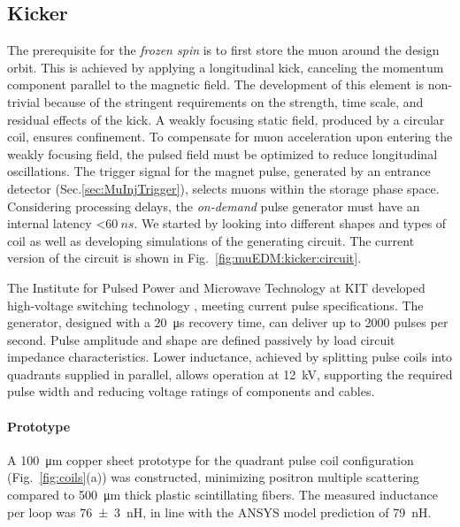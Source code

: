 \begin{refsection}
    \subsection{Kicker}
        The prerequisite for the \textit{frozen spin} is to first store the muon around the design orbit.
        This is achieved by applying a longitudinal kick, canceling the momentum component parallel to the magnetic field.
        The development of this element is non-trivial because of the stringent requirements on the strength, time scale, and residual effects of the kick.
        A weakly focusing static field, produced by a circular coil, ensures confinement. 
        To compensate for muon acceleration upon entering the weakly focusing field, the pulsed field must be optimized to reduce longitudinal oscillations.
        The trigger signal for the magnet pulse, generated by an entrance detector (Sec.\ref{sec:MuInjTrigger}), selects muons within the storage phase space. 
        Considering processing delays, the \textit{on-demand} pulse generator must have an internal latency <$\SI{60}{ns}$.
        We started by looking into different shapes and types of coil as well as developing \ltsp simulations of the generating circuit.
        The current version of the circuit is shown in Fig.~\ref{fig:muEDM:kicker:circuit}.
        
        The Institute for Pulsed Power and Microwave Technology at KIT developed high-voltage switching technology \cite{GateBoosting}, meeting current pulse specifications. 
        The generator, designed with a \SI{20}{\micro s} recovery time, can deliver up to 2000 pulses per second. 
        Pulse amplitude and shape are defined passively by load circuit impedance characteristics. 
        Lower inductance, achieved by splitting pulse coils into quadrants supplied in parallel, allows operation at \SI{12}{kV}, supporting the required pulse width and reducing voltage ratings of components and cables.

        \paragraph{Prototype}
        A \SI{100}{\micro m} copper sheet prototype for the quadrant pulse coil configuration (Fig.~\ref{fig:coils}(a)) was constructed, minimizing positron multiple scattering compared to \SI{500}{\micro m} thick plastic scintillating fibers. 
        The measured inductance per loop was \SI{76(3)}{nH}, in line with the ANSYS model prediction of \SI{79}{nH}.
        

\end{refsection}

